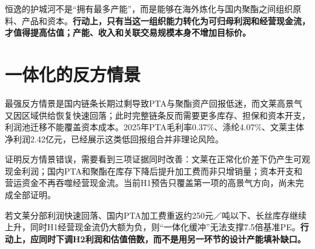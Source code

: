 \begin{keyinsight}
恒逸的护城河不是“拥有最多产能”，而是能够在海外炼化与国内聚酯之间组织原料、产品和资本。\textbf{行动上，只有当这一组织能力转化为可归母利润和经营现金流，才值得提高估值；产能、收入和关联交易规模本身不增加目标价。}
\end{keyinsight}

\section{一体化的反方情景}

最强反方情景是国内链条长期过剩导致PTA与聚酯资产回报低迷，而文莱高景气又因区域供给恢复快速回落；此时完整链条反而需要更多库存、担保和资本开支，利润池迁移不能覆盖资本成本。2025年PTA毛利率0.37\%、涤纶4.07\%、文莱主体净利润2.42亿元，已经展示这类低回报组合并非理论风险。

证明反方情景错误，需要看到三项证据同时改善：文莱在正常化价差下仍产生可观现金利润；国内PTA和聚酯在库存下降后提升加工费而非只增销量；资本开支和营运资金不再吞噬经营现金流。当前H1预告只覆盖第一项的高景气方向，尚未完成全部证明。

\begin{riskbox}[商业模式失效阈值]
若文莱分部利润快速回落、国内PTA加工费重返约250元／吨以下、长丝库存继续上升，同时H1经营现金流仍大额为负，则“一体化缓冲”无法支撑7.5倍基准PE。\textbf{行动上，应同时下调H2利润和估值倍数，而不是用另一环节的设计产能填补缺口。}
\end{riskbox}
